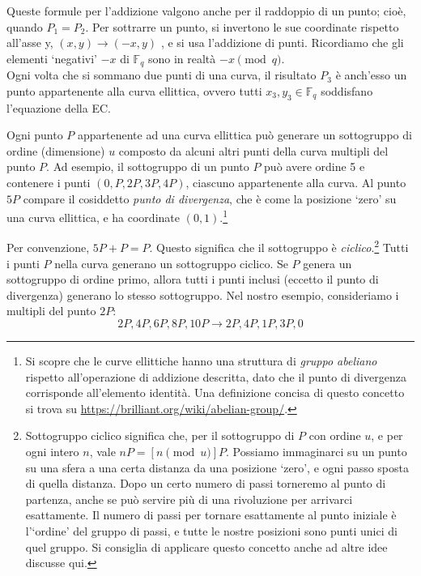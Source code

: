 Queste formule per l’addizione valgono anche per il raddoppio di un punto; cioè, quando \(P_1 = P_2\). Per sottrarre un punto, si invertono le sue coordinate rispetto all’asse y, \((x,y) \rightarrow (-x,y)\) \cite{Bernstein2008}, e si usa l’addizione di punti. Ricordiamo che gli elementi `negativi’ \(-x\) di \(\mathbb{F}_q\) sono in realtà \(-x \pmod{q}\).
\\

Ogni volta che si sommano due punti di una curva, il risultato \(P_3\) è anch'esso un punto appartenente alla curva ellittica, ovvero tutti \(x_3,y_3 \in \mathbb{F}_q\) soddisfano l’equazione della EC.

Ogni punto \(P\) appartenente ad una curva ellittica può generare un sottogruppo di ordine (dimensione) \(u\) composto da alcuni altri punti della curva multipli del punto \(P\). Ad esempio, il sottogruppo di un punto \(P\) può avere ordine 5 e contenere i punti \((0, P, 2P, 3P, 4P)\), ciascuno appartenente alla curva. Al punto \(5P\) compare il cosiddetto {\em punto di divergenza}, che è come la posizione `zero’ su una curva ellittica, e ha coordinate \((0,1)\).\footnote{Si scopre che le curve ellittiche hanno una struttura di {\em gruppo abeliano} rispetto all’operazione di addizione descritta, dato che il punto di divergenza corrisponde all’elemento identità. Una definizione concisa di questo concetto si trova su \url{https://brilliant.org/wiki/abelian-group/}.}

Per convenzione, \(5P + P = P\). Questo significa che il sottogruppo è {\em ciclico}.\footnote{\label{cyclical_note}Sottogruppo ciclico significa che, per il sottogruppo di \(P\) con ordine \(u\), e per ogni intero \(n\), vale \(n P = [n \pmod{u}] P\). Possiamo immaginarci su un punto su una sfera a una certa distanza da una posizione `zero’, e ogni passo sposta di quella distanza. Dopo un certo numero di passi torneremo al punto di partenza, anche se può servire più di una rivoluzione per arrivarci esattamente. Il numero di passi per tornare esattamente al punto iniziale è l’`ordine’ del gruppo di passi, e tutte le nostre posizioni sono punti unici di quel gruppo. Si consiglia di applicare questo concetto anche ad altre idee discusse qui.} Tutti i punti \(P\) nella curva generano un sottogruppo ciclico. Se \(P\) genera un sottogruppo di ordine primo, allora tutti i punti inclusi (eccetto il punto di divergenza) generano lo stesso sottogruppo. Nel nostro esempio, consideriamo i multipli del punto \(2P\):\vspace{.175cm}
\[2P, 4P, 6P, 8P, 10P \rightarrow 2P, 4P, 1P, 3P, 0\]

